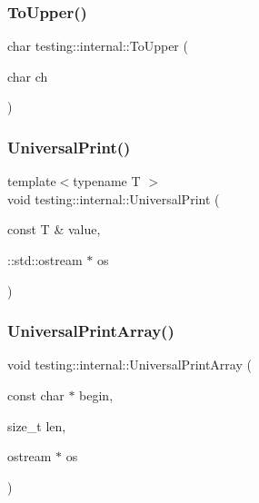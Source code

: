 \mbox{\label{namespacetesting_1_1internal_ac1b876a8133895bd553d4780ecaa1e3a}} 
\subsubsection{\texorpdfstring{ToUpper()}{ToUpper()}}
{\footnotesize\ttfamily char testing\+::internal\+::\+To\+Upper (\begin{DoxyParamCaption}\item[{char}]{ch }\end{DoxyParamCaption})\hspace{0.3cm}{\ttfamily [inline]}}

\mbox{\label{namespacetesting_1_1internal_a30708fa2bacf11895b03bdb21eb72309}} 
\subsubsection{\texorpdfstring{UniversalPrint()}{UniversalPrint()}}
{\footnotesize\ttfamily template$<$typename T $>$ \\
void testing\+::internal\+::\+Universal\+Print (\begin{DoxyParamCaption}\item[{const T \&}]{value,  }\item[{\+::std\+::ostream $\ast$}]{os }\end{DoxyParamCaption})}

\mbox{\label{namespacetesting_1_1internal_a070107e7a8205ad6ec4d538d52b15b38}} 
\subsubsection{\texorpdfstring{UniversalPrintArray()}{UniversalPrintArray()}\hspace{0.1cm}{\footnotesize\ttfamily [1/5]}}
{\footnotesize\ttfamily void testing\+::internal\+::\+Universal\+Print\+Array (\begin{DoxyParamCaption}\item[{const char $\ast$}]{begin,  }\item[{size\+\_\+t}]{len,  }\item[{ostream $\ast$}]{os }\end{DoxyParamCaption})}

